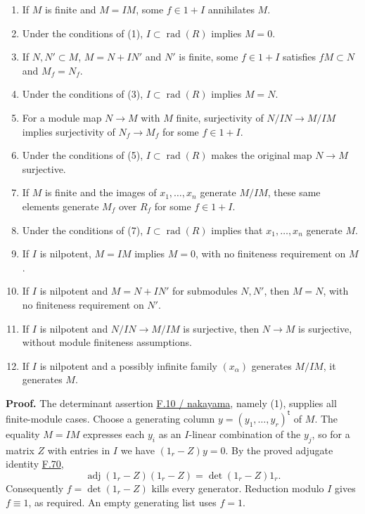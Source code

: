 \documentclass[11pt,a4paper,openany]{report}
\providecommand{\tightlist}{\setlength{\itemsep}{0pt}\setlength{\parskip}{0pt}}
\begin{document}
\begin{enumerate}
\def\labelenumi{\arabic{enumi}.}
\tightlist
\item
  If \(M\) is finite and \(M=IM\), some \(f\in1+I\) annihilates \(M\).
\item
  Under the conditions of (1), \(I\subset\operatorname{rad}(R)\) implies \(M=0\).
\item
  If \(N,N'\subset M\), \(M=N+IN'\) and \(N'\) is finite, some \(f\in1+I\) satisfies \(fM\subset N\) and \(M_f=N_f\).
\item
  Under the conditions of (3), \(I\subset\operatorname{rad}(R)\) implies \(M=N\).
\item
  For a module map \(N\to M\) with \(M\) finite, surjectivity of \(N/IN\to M/IM\) implies surjectivity of \(N_f\to M_f\) for some \(f\in1+I\).
\item
  Under the conditions of (5), \(I\subset\operatorname{rad}(R)\) makes the original map \(N\to M\) surjective.
\item
  If \(M\) is finite and the images of \(x_1,\ldots,x_n\) generate \(M/IM\), these same elements generate \(M_f\) over \(R_f\) for some \(f\in1+I\).
\item
  Under the conditions of (7), \(I\subset\operatorname{rad}(R)\) implies that \(x_1,\ldots,x_n\) generate \(M\).
\item
  If \(I\) is nilpotent, \(M=IM\) implies \(M=0\), with no finiteness requirement on \(M\).
\item
  If \(I\) is nilpotent and \(M=N+IN'\) for submodules \(N,N'\), then \(M=N\), with no finiteness requirement on \(N'\).
\item
  If \(I\) is nilpotent and \(N/IN\to M/IM\) is surjective, then \(N\to M\) is surjective, without module finiteness assumptions.
\item
  If \(I\) is nilpotent and a possibly infinite family \((x_\alpha)\) generates \(M/IM\), it generates \(M\).
\end{enumerate}

\textbf{Proof.} The determinant assertion \hyperref[AG-RG-S05-algebra-lemma-NAK]{F.10 / nakayama}, namely (1), supplies all finite-module cases. Choose a generating column \(y=(y_1,\ldots,y_r)^{\mathsf t}\) of \(M\). The equality \(M=IM\) expresses each \(y_i\) as an \(I\)-linear combination of the \(y_j\), so for a matrix \(Z\) with entries in \(I\) we have \((1_r-Z)y=0\). By the proved adjugate identity \hyperref[AG-RG-S05-algebra-lemma-matrix-left-inverse]{F.70}, \[\operatorname{adj}(1_r-Z)(1_r-Z)=\det(1_r-Z)1_r.\] Consequently \(f=\det(1_r-Z)\) kills every generator. Reduction modulo \(I\) gives \(f\equiv1\), as required. An empty generating list uses \(f=1\).
\end{document}
